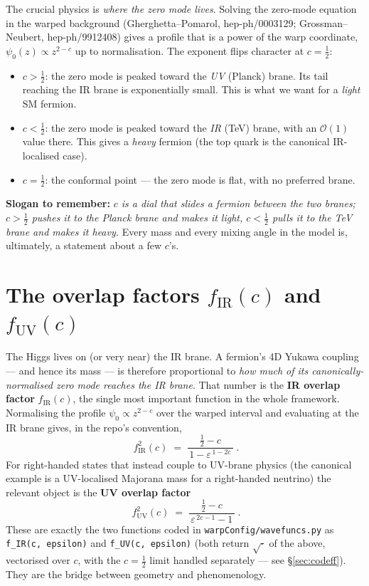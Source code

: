 \documentclass[11pt]{article}
\newcommand{\half}{\tfrac{1}{2}}
\newcommand{\eps}{\varepsilon}
\newcommand{\fIR}{f_{\mathrm{IR}}}
\newcommand{\fUV}{f_{\mathrm{UV}}}
\newcommand{\code}[1]{\texttt{#1}}
\theoremstyle{definition}
\begin{document}
The crucial physics is \emph{where the zero mode lives}. Solving the zero-mode
equation in the warped background (Gherghetta--Pomarol, hep-ph/0003129;
Grossman--Neubert, hep-ph/9912408) gives a profile that is a power of the warp
coordinate, $\psi_0(z)\propto z^{2-c}$ up to normalisation. The exponent flips
character at $c=\half$:
\begin{itemize}[leftmargin=1.4em]
\item \textbf{$c>\half$}: the zero mode is peaked toward the \emph{UV} (Planck)
brane. Its tail reaching the IR brane is exponentially small. This is what we want
for a \emph{light} SM fermion.
\item \textbf{$c<\half$}: the zero mode is peaked toward the \emph{IR} (TeV)
brane, with an $\mathcal{O}(1)$ value there. This gives a \emph{heavy} fermion
(the top quark is the canonical IR-localised case).
\item \textbf{$c=\half$}: the conformal point --- the zero mode is flat, with no
preferred brane.
\end{itemize}
\textbf{Slogan to remember:} \emph{$c$ is a dial that slides a fermion between the
two branes; $c>\half$ pushes it to the Planck brane and makes it light, $c<\half$
pulls it to the TeV brane and makes it heavy.} Every mass and every mixing angle
in the model is, ultimately, a statement about a few $c$'s.

\section{The overlap factors $f_{\mathrm{IR}}(c)$ and $f_{\mathrm{UV}}(c)$}
\label{sec:ffactors}

The Higgs lives on (or very near) the IR brane. A fermion's 4D Yukawa coupling ---
and hence its mass --- is therefore proportional to \emph{how much of its
canonically-normalised zero mode reaches the IR brane}. That number is the
\textbf{IR overlap factor} $\fIR(c)$, the single most important function in the
whole framework. Normalising the profile $\psi_0\propto z^{2-c}$ over the warped
interval and evaluating at the IR brane gives, in the repo's convention,
\begin{equation}
\boxed{\;\fIR^2(c) \;=\; \frac{\half - c}{\,1 - \eps^{\,1-2c}\,}\;.}
\label{eq:fIR}
\end{equation}
For right-handed states that instead couple to UV-brane physics (the canonical
example is a UV-localised Majorana mass for a right-handed neutrino) the relevant
object is the \textbf{UV overlap factor}
\begin{equation}
\boxed{\;\fUV^2(c) \;=\; \frac{\half - c}{\,\eps^{\,2c-1} - 1\,}\;.}
\label{eq:fUV}
\end{equation}
These are exactly the two functions coded in \code{warpConfig/wavefuncs.py} as
\code{f\_IR(c, epsilon)} and \code{f\_UV(c, epsilon)} (both return $\sqrt{\cdot}$
of the above, vectorised over $c$, with the $c=\half$ limit handled separately ---
see \S\ref{sec:codeff}). They are the bridge between geometry and phenomenology.
\end{document}
